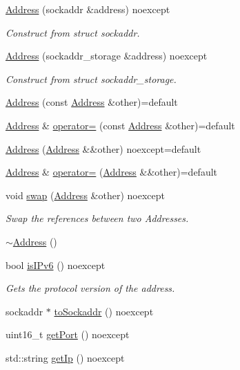\begin{DoxyCompactItemize}
\hyperlink{classtnnf_1_1_address_a7c732337c696e250adba2f5e208d3726}{Address} (sockaddr \&address) noexcept
\begin{DoxyCompactList}\small\item\em Construct from struct sockaddr. \end{DoxyCompactList}\item 
\hyperlink{classtnnf_1_1_address_a3973462b097fb7f725f60b91c434f23b}{Address} (sockaddr\+\_\+storage \&address) noexcept
\begin{DoxyCompactList}\small\item\em Construct from struct sockaddr\+\_\+storage. \end{DoxyCompactList}\item 
\hyperlink{classtnnf_1_1_address_ac161d2ea51f1dc6433861a104beb91e4}{Address} (const \hyperlink{classtnnf_1_1_address}{Address} \&other)=default
\item 
\hyperlink{classtnnf_1_1_address}{Address} \& \hyperlink{classtnnf_1_1_address_a130ecd6edae96b7f377f9c751f6dd850}{operator=} (const \hyperlink{classtnnf_1_1_address}{Address} \&other)=default
\item 
\hyperlink{classtnnf_1_1_address_acadbe08d9c04ad1fdb06914189a600bf}{Address} (\hyperlink{classtnnf_1_1_address}{Address} \&\&other) noexcept=default
\item 
\hyperlink{classtnnf_1_1_address}{Address} \& \hyperlink{classtnnf_1_1_address_a230be61ba1dee418ddafa31f6ee693a1}{operator=} (\hyperlink{classtnnf_1_1_address}{Address} \&\&other)=default
\item 
void \hyperlink{classtnnf_1_1_address_a5b57d1c17ea3924c58a77d5b35115225}{swap} (\hyperlink{classtnnf_1_1_address}{Address} \&other) noexcept
\begin{DoxyCompactList}\small\item\em Swap the references between two Addresses. \end{DoxyCompactList}\item 
\hyperlink{classtnnf_1_1_address_ab2b6267bae0725467336329331ed9fd2}{$\sim$\+Address} ()
\item 
bool \hyperlink{classtnnf_1_1_address_ab09c57b4f764a8bcdf185486a1973caf}{is\+I\+Pv6} () noexcept
\begin{DoxyCompactList}\small\item\em Gets the protocol version of the address. \end{DoxyCompactList}\item 
sockaddr $\ast$ \hyperlink{classtnnf_1_1_address_a50e5468cca7ea15bdf9e5256cb14a2a7}{to\+Sockaddr} () noexcept
\item 
uint16\+\_\+t \hyperlink{classtnnf_1_1_address_a2cc271b7bd8d5f943839a49530bf7590}{get\+Port} () noexcept
\item 
std\+::string \hyperlink{classtnnf_1_1_address_a359b7f30078ad80f6778b026985bf414}{get\+Ip} () noexcept
\end{DoxyCompactItemize}


